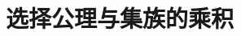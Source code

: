\section{选择公理与集族的乘积}








































































































